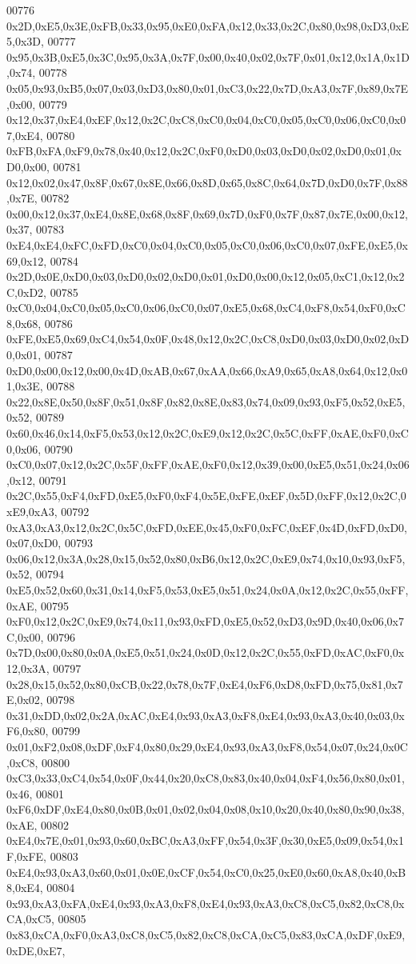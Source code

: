 \begin{DoxyCode}
00776 0x2D,0xE5,0x3E,0xFB,0x33,0x95,0xE0,0xFA,0x12,0x33,0x2C,0x80,0x98,0xD3,0xE5,0x3D,
00777 0x95,0x3B,0xE5,0x3C,0x95,0x3A,0x7F,0x00,0x40,0x02,0x7F,0x01,0x12,0x1A,0x1D,0x74,
00778 0x05,0x93,0xB5,0x07,0x03,0xD3,0x80,0x01,0xC3,0x22,0x7D,0xA3,0x7F,0x89,0x7E,0x00,
00779 0x12,0x37,0xE4,0xEF,0x12,0x2C,0xC8,0xC0,0x04,0xC0,0x05,0xC0,0x06,0xC0,0x07,0xE4,
00780 0xFB,0xFA,0xF9,0x78,0x40,0x12,0x2C,0xF0,0xD0,0x03,0xD0,0x02,0xD0,0x01,0xD0,0x00,
00781 0x12,0x02,0x47,0x8F,0x67,0x8E,0x66,0x8D,0x65,0x8C,0x64,0x7D,0xD0,0x7F,0x88,0x7E,
00782 0x00,0x12,0x37,0xE4,0x8E,0x68,0x8F,0x69,0x7D,0xF0,0x7F,0x87,0x7E,0x00,0x12,0x37,
00783 0xE4,0xE4,0xFC,0xFD,0xC0,0x04,0xC0,0x05,0xC0,0x06,0xC0,0x07,0xFE,0xE5,0x69,0x12,
00784 0x2D,0x0E,0xD0,0x03,0xD0,0x02,0xD0,0x01,0xD0,0x00,0x12,0x05,0xC1,0x12,0x2C,0xD2,
00785 0xC0,0x04,0xC0,0x05,0xC0,0x06,0xC0,0x07,0xE5,0x68,0xC4,0xF8,0x54,0xF0,0xC8,0x68,
00786 0xFE,0xE5,0x69,0xC4,0x54,0x0F,0x48,0x12,0x2C,0xC8,0xD0,0x03,0xD0,0x02,0xD0,0x01,
00787 0xD0,0x00,0x12,0x00,0x4D,0xAB,0x67,0xAA,0x66,0xA9,0x65,0xA8,0x64,0x12,0x01,0x3E,
00788 0x22,0x8E,0x50,0x8F,0x51,0x8F,0x82,0x8E,0x83,0x74,0x09,0x93,0xF5,0x52,0xE5,0x52,
00789 0x60,0x46,0x14,0xF5,0x53,0x12,0x2C,0xE9,0x12,0x2C,0x5C,0xFF,0xAE,0xF0,0xC0,0x06,
00790 0xC0,0x07,0x12,0x2C,0x5F,0xFF,0xAE,0xF0,0x12,0x39,0x00,0xE5,0x51,0x24,0x06,0x12,
00791 0x2C,0x55,0xF4,0xFD,0xE5,0xF0,0xF4,0x5E,0xFE,0xEF,0x5D,0xFF,0x12,0x2C,0xE9,0xA3,
00792 0xA3,0xA3,0x12,0x2C,0x5C,0xFD,0xEE,0x45,0xF0,0xFC,0xEF,0x4D,0xFD,0xD0,0x07,0xD0,
00793 0x06,0x12,0x3A,0x28,0x15,0x52,0x80,0xB6,0x12,0x2C,0xE9,0x74,0x10,0x93,0xF5,0x52,
00794 0xE5,0x52,0x60,0x31,0x14,0xF5,0x53,0xE5,0x51,0x24,0x0A,0x12,0x2C,0x55,0xFF,0xAE,
00795 0xF0,0x12,0x2C,0xE9,0x74,0x11,0x93,0xFD,0xE5,0x52,0xD3,0x9D,0x40,0x06,0x7C,0x00,
00796 0x7D,0x00,0x80,0x0A,0xE5,0x51,0x24,0x0D,0x12,0x2C,0x55,0xFD,0xAC,0xF0,0x12,0x3A,
00797 0x28,0x15,0x52,0x80,0xCB,0x22,0x78,0x7F,0xE4,0xF6,0xD8,0xFD,0x75,0x81,0x7E,0x02,
00798 0x31,0xDD,0x02,0x2A,0xAC,0xE4,0x93,0xA3,0xF8,0xE4,0x93,0xA3,0x40,0x03,0xF6,0x80,
00799 0x01,0xF2,0x08,0xDF,0xF4,0x80,0x29,0xE4,0x93,0xA3,0xF8,0x54,0x07,0x24,0x0C,0xC8,
00800 0xC3,0x33,0xC4,0x54,0x0F,0x44,0x20,0xC8,0x83,0x40,0x04,0xF4,0x56,0x80,0x01,0x46,
00801 0xF6,0xDF,0xE4,0x80,0x0B,0x01,0x02,0x04,0x08,0x10,0x20,0x40,0x80,0x90,0x38,0xAE,
00802 0xE4,0x7E,0x01,0x93,0x60,0xBC,0xA3,0xFF,0x54,0x3F,0x30,0xE5,0x09,0x54,0x1F,0xFE,
00803 0xE4,0x93,0xA3,0x60,0x01,0x0E,0xCF,0x54,0xC0,0x25,0xE0,0x60,0xA8,0x40,0xB8,0xE4,
00804 0x93,0xA3,0xFA,0xE4,0x93,0xA3,0xF8,0xE4,0x93,0xA3,0xC8,0xC5,0x82,0xC8,0xCA,0xC5,
00805 0x83,0xCA,0xF0,0xA3,0xC8,0xC5,0x82,0xC8,0xCA,0xC5,0x83,0xCA,0xDF,0xE9,0xDE,0xE7,

\end{DoxyCode}
